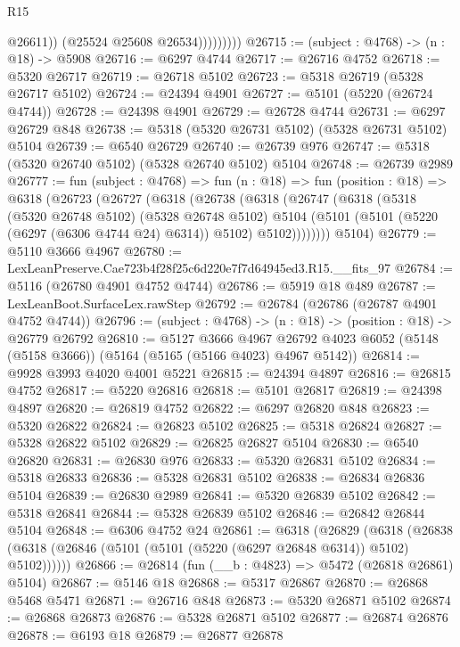 \begin{lexlean}{R15}
\begin{coremodule}
{{{{{{{{{{{                        @26611))
                    (@25524 @25608 @26534)))))))))
@26715 := (subject : @4768) -> (n : @18) -> @5908
@26716 := @6297 @4744
@26717 := @26716 @4752
@26718 := @5320 @26717
@26719 := @26718 @5102
@26723 := @5318 @26719 (@5328 @26717 @5102)
@26724 := @24394 @4901
@26727 := @5101 (@5220 (@26724 @4744))
@26728 := @24398 @4901
@26729 := @26728 @4744
@26731 := @6297 @26729 @848
@26738 := @5318 (@5320 @26731 @5102) (@5328 @26731 @5102) @5104
@26739 := @6540 @26729
@26740 := @26739 @976
@26747 := @5318 (@5320 @26740 @5102) (@5328 @26740 @5102) @5104
@26748 := @26739 @2989
@26777 := fun (subject : @4768) =>
  fun (n : @18) =>
  fun (position : @18) =>
  @6318
    (@26723
      (@26727
        (@6318
          (@26738
            (@6318
              (@26747
                (@6318
                  (@5318
                    (@5320 @26748 @5102)
                    (@5328 @26748 @5102)
                    @5104
                    (@5101 (@5101 (@5220 (@6297 (@6306 @4744 @24) @6314)) @5102) @5102))))))))
      @5104)
@26779 := @5110 @3666 @4967
@26780 := LexLeanPreserve.Cae723b4f28f25c6d220e7f7d64945ed3.R15.__fits_97
@26784 := @5116 (@26780 @4901 @4752 @4744)
@26786 := @5919 @18 @489
@26787 := LexLeanBoot.SurfaceLex.rawStep
@26792 := @26784 (@26786 (@26787 @4901 @4752 @4744))
@26796 := (subject : @4768) -> (n : @18) -> (position : @18) -> @26779 @26792
@26810 := @5127
    @3666
    @4967
    @26792
    @4023
    @6052
    (@5148 (@5158 @3666))
    (@5164 (@5165 (@5166 @4023) @4967 @5142))
@26814 := @9928 @3993 @4020 @4001 @5221
@26815 := @24394 @4897
@26816 := @26815 @4752
@26817 := @5220 @26816
@26818 := @5101 @26817
@26819 := @24398 @4897
@26820 := @26819 @4752
@26822 := @6297 @26820 @848
@26823 := @5320 @26822
@26824 := @26823 @5102
@26825 := @5318 @26824
@26827 := @5328 @26822 @5102
@26829 := @26825 @26827 @5104
@26830 := @6540 @26820
@26831 := @26830 @976
@26833 := @5320 @26831 @5102
@26834 := @5318 @26833
@26836 := @5328 @26831 @5102
@26838 := @26834 @26836 @5104
@26839 := @26830 @2989
@26841 := @5320 @26839 @5102
@26842 := @5318 @26841
@26844 := @5328 @26839 @5102
@26846 := @26842 @26844 @5104
@26848 := @6306 @4752 @24
@26861 := @6318
    (@26829
      (@6318 (@26838 (@6318 (@26846 (@5101 (@5101 (@5220 (@6297 @26848 @6314)) @5102) @5102))))))
@26866 := @26814 (fun (__b : @4823) => @5472 (@26818 @26861) @5104)
@26867 := @5146 @18
@26868 := @5317 @26867
@26870 := @26868 @5468 @5471
@26871 := @26716 @848
@26873 := @5320 @26871 @5102
@26874 := @26868 @26873
@26876 := @5328 @26871 @5102
@26877 := @26874 @26876
@26878 := @6193 @18
@26879 := @26877 @26878
}}}}}}}}}}}
\end{coremodule}
\end{lexlean}
